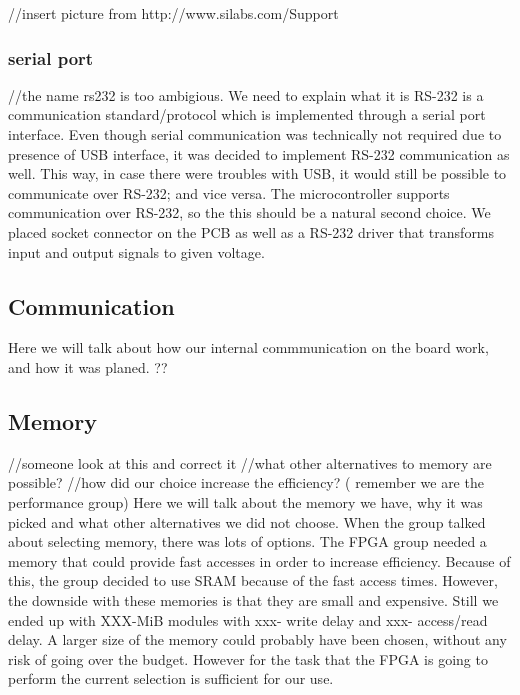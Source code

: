 //insert picture from http://www.silabs.com/Support%


\subsubsection{serial port} //the name rs232 is too ambigious. We need to explain what it is
RS-232 is a communication standard/protocol which is implemented through a serial port interface.
Even though serial communication was technically not required due to presence of USB interface, it was decided to implement RS-232 communication as well.
This way, in case there were troubles with USB, it would still be possible to communicate over RS-232; and vice versa.
The microcontroller supports communication over RS-232, so the this should be a natural second choice.
We placed socket connector on the PCB as well as a RS-232 driver that transforms input and output signals to given voltage.

\subsection{Communication} \label{pcb:design-choices:ss:internal_communication}

Here we will talk about how our internal commmunication on the board work, and how it was planed.
??


\subsection{Memory} \label{pcb:design-choices:ss:memory}
//someone look at this and correct it
//what other alternatives to memory are possible?
//how did our choice increase the efficiency? ( remember we are the performance group)
Here we will talk about the memory we have, why it was picked and what other alternatives we did not choose.
When the group talked about selecting memory, there was lots of options. The FPGA group needed a memory that could provide 
fast accesses in order to increase efficiency. Because of this, the group decided to use SRAM because of the fast access times.
However, the downside with these memories is that they are small and expensive. Still we ended up with XXX-MiB modules with xxx- write delay and xxx- access/read delay.
A larger size of the memory could probably have been chosen, without any risk of going over the budget. However for the task that the FPGA is going to perform
the current selection is sufficient for our use.
